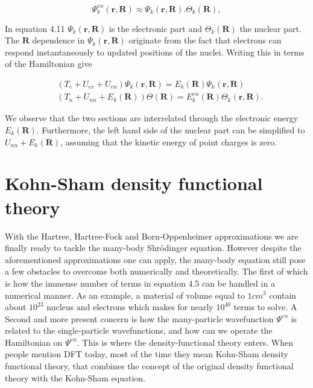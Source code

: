 \begin{equation}
    \Psi_{k}^{en}(\boldsymbol{r}, \boldsymbol{R}) \approx \Psi_k(\boldsymbol{r}, \boldsymbol{R}). \Theta_k(\boldsymbol{R}),
\end{equation}

In equation 4.11 $\Psi_k(\boldsymbol{r}, \boldsymbol{R})$ is the electronic part and $\Theta_k(\boldsymbol{R})$ the nuclear part. The $\boldsymbol{R}$ dependence in $\Psi_k(\boldsymbol{r}, \boldsymbol{R})$ originate from the fact that electrons can respond instantaneously to updated positions of the nuclei. Writing this in terms of the Hamiltonian give

\begin{align}
    &\left( T_{e} + U_{ee} + U_{en} \right) \Psi_k(\boldsymbol{r}, \boldsymbol{R}) = E_k(\boldsymbol{R})\Psi_k(\boldsymbol{r}, \boldsymbol{R}) \\
    &\left( T_{n} + U_{nn} + E_k(\boldsymbol{R}) \right) \Theta(\boldsymbol{R}) = E_{k}^{en}(\boldsymbol{R})\Theta_k(\boldsymbol{r}, \boldsymbol{R}).
\end{align}

We observe that the two sections are interrelated through the electronic energy $E_k(\boldsymbol{R})$. Furthermore, the left hand side of the nuclear part can be simplified to $U_{nn} + E_k(\boldsymbol{R})$, assuming that the kinetic energy of point charges is zero.

\section{Kohn-Sham density functional theory}

With the Hartree, Hartree-Fock and Born-Oppenheimer approximations we are finally ready to tackle the many-body Shr\"{o}dinger equation. However despite the aforementioned approximations one can apply, the many-body equation still pose a few obstacles to overcome both numerically and theoretically. The first of which is how the immense number of terms in equation 4.5 can be handled in a numerical manner. As an example, a material of volume equal to $1cm^3$ contain about $10^{23}$ nucleus and electrons which makes for nearly $10^{40}$ terms to solve. A Second and more present concern is how the many-particle wavefunction $\Psi^{en}$ is related to the single-particle wavefunctions, and how can we operate the Hamiltonian on $\Psi^{en}$. This is where the density-functional theory enters. When people mention DFT today, most of the time they mean Kohn-Sham density functional theory, that combines the concept of the original density functional theory with the Kohn-Sham equation.

